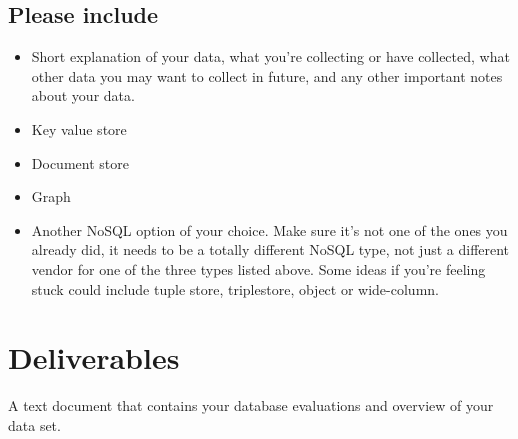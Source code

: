 \documentclass[12pt]{article}
\begin{document}
\subsection*{Please include}
    \begin{itemize}
        \item Short explanation of your data, what you're collecting or have collected, what other data you may want to collect in future, and any other important notes about your data. 
        \item Key value store
        \item Document store
        \item Graph
        \item Another NoSQL option of your choice.  Make sure it's not one of the ones you already did, it needs to be a totally different NoSQL type, not just a different vendor for one of the three types listed above. Some ideas if you're feeling stuck could include tuple store, triplestore, object or wide-column.
    \end{itemize}



\section*{Deliverables}
A text document that contains your database evaluations and overview of your data set.
\end{document}
